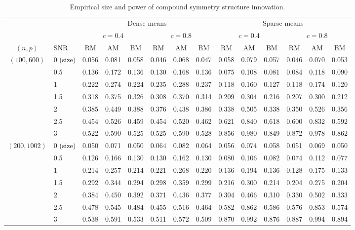 \documentclass[3p]{elsarticle}
\theoremstyle{plain}
\theoremstyle{definition}
\theoremstyle{remark}
\begin{document}
\begin{table}[ht]
    \caption{Empirical size and power of compound symmetry structure innovation.}
\label{table4}
\footnotesize
    \centering
    \begin{tabular}{clcccccccccccc}
          \toprule
          & & \multicolumn{6}{c}{Dense means} &\multicolumn{6}{c}{Sparse means}\\
          \cmidrule(r){3-8}\cmidrule(r){9-14}
          & & \multicolumn{3}{c}{$c=0.4$} & \multicolumn{3}{c}{$c=0.8$} & \multicolumn{3}{c}{$c=0.4$}& \multicolumn{3}{c}{$c=0.8$}\\
          \cmidrule(r){3-5}  \cmidrule(r){6-8} \cmidrule(r){9-11}  \cmidrule(r){12-14}
           $(n,p)$ &SNR & RM & AM & BM & RM & AM & BM & RM & AM & BM & RM & AM & BM  \\ 
            \midrule
        $(100,600)$&0 (size) & 0.056 & 0.081 & 0.058 & 0.046 & 0.068 & 0.047 & 0.058 & 0.079 & 0.057 & 0.046 & 0.070 & 0.053 \\ 
        &0.5 & 0.136 & 0.172 & 0.136 & 0.130 & 0.168 & 0.136 & 0.075 & 0.108 & 0.081 & 0.084 & 0.118 & 0.090 \\ 
        &1 & 0.222 & 0.274 & 0.224 & 0.235 & 0.288 & 0.237 & 0.118 & 0.160 & 0.127 & 0.118 & 0.174 & 0.120 \\ 
        &1.5 & 0.318 & 0.375 & 0.326 & 0.308 & 0.370 & 0.314 & 0.209 & 0.304 & 0.216 & 0.207 & 0.300 & 0.212 \\ 
        &2 & 0.385 & 0.449 & 0.388 & 0.376 & 0.438 & 0.386 & 0.338 & 0.505 & 0.338 & 0.350 & 0.526 & 0.356 \\ 
        &2.5 & 0.454 & 0.526 & 0.459 & 0.454 & 0.520 & 0.462 & 0.621 & 0.840 & 0.618 & 0.600 & 0.832 & 0.592 \\ 
        &3 & 0.522 & 0.590 & 0.525 & 0.525 & 0.590 & 0.528 & 0.856 & 0.980 & 0.849 & 0.872 & 0.978 & 0.862 \\ 
        \midrule
        $(200,1002)$ & 0 (size) & 0.050 & 0.071 & 0.050 & 0.064 & 0.082 & 0.064 & 0.056 & 0.074 & 0.058 & 0.051 & 0.069 & 0.050 \\
        &0.5 & 0.126 & 0.166 & 0.130 & 0.130 & 0.162 & 0.130 & 0.080 & 0.106 & 0.082 & 0.074 & 0.112 & 0.077 \\
        &1 & 0.214 & 0.257 & 0.214 & 0.221 & 0.268 & 0.220 & 0.136 & 0.194 & 0.136 & 0.128 & 0.175 & 0.133 \\
        &1.5 & 0.292 & 0.344 & 0.294 & 0.298 & 0.359 & 0.299 & 0.216 & 0.300 & 0.214 & 0.204 & 0.275 & 0.204 \\
        &2 & 0.384 & 0.450 & 0.392 & 0.371 & 0.436 & 0.377 & 0.304 & 0.466 & 0.310 & 0.330 & 0.502 & 0.333 \\
        &2.5 & 0.478 & 0.545 & 0.484 & 0.455 & 0.516 & 0.464 & 0.582 & 0.862 & 0.586 & 0.576 & 0.853 & 0.574 \\
        &3 & 0.538 & 0.591 & 0.533 & 0.511 & 0.572 & 0.509 & 0.870 & 0.992 & 0.876 & 0.887 & 0.994 & 0.894 \\
        \bottomrule
    \end{tabular}
\end{table}
\end{document}
